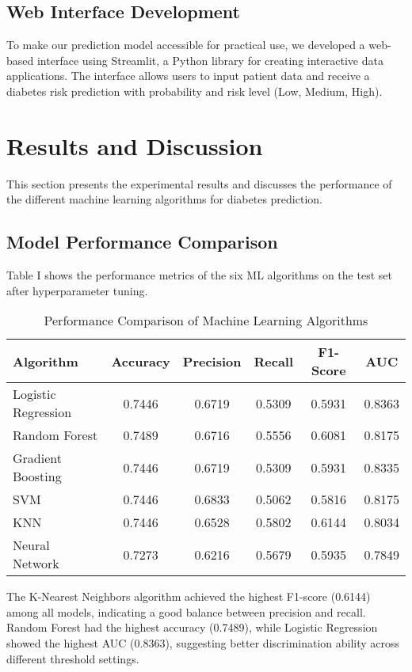 \documentclass[conference]{IEEEtran}
\begin{document}
\subsection{Web Interface Development}
To make our prediction model accessible for practical use, we developed a web-based interface using Streamlit, a Python library for creating interactive data applications. The interface allows users to input patient data and receive a diabetes risk prediction with probability and risk level (Low, Medium, High).

\section{Results and Discussion}
This section presents the experimental results and discusses the performance of the different machine learning algorithms for diabetes prediction.

\subsection{Model Performance Comparison}
Table I shows the performance metrics of the six ML algorithms on the test set after hyperparameter tuning.

\begin{table}[htbp]
\caption{Performance Comparison of Machine Learning Algorithms}
\begin{center}
\begin{tabular}{|l|c|c|c|c|c|}
\hline
\textbf{Algorithm} & \textbf{Accuracy} & \textbf{Precision} & \textbf{Recall} & \textbf{F1-Score} & \textbf{AUC} \\
\hline
Logistic Regression & 0.7446 & 0.6719 & 0.5309 & 0.5931 & 0.8363 \\
\hline
Random Forest & 0.7489 & 0.6716 & 0.5556 & 0.6081 & 0.8175 \\
\hline
Gradient Boosting & 0.7446 & 0.6719 & 0.5309 & 0.5931 & 0.8335 \\
\hline
SVM & 0.7446 & 0.6833 & 0.5062 & 0.5816 & 0.8175 \\
\hline
KNN & 0.7446 & 0.6528 & 0.5802 & 0.6144 & 0.8034 \\
\hline
Neural Network & 0.7273 & 0.6216 & 0.5679 & 0.5935 & 0.7849 \\
\hline
\end{tabular}
\label{tab1}
\end{center}
\end{table}

The K-Nearest Neighbors algorithm achieved the highest F1-score (0.6144) among all models, indicating a good balance between precision and recall. Random Forest had the highest accuracy (0.7489), while Logistic Regression showed the highest AUC (0.8363), suggesting better discrimination ability across different threshold settings.
\end{document}
